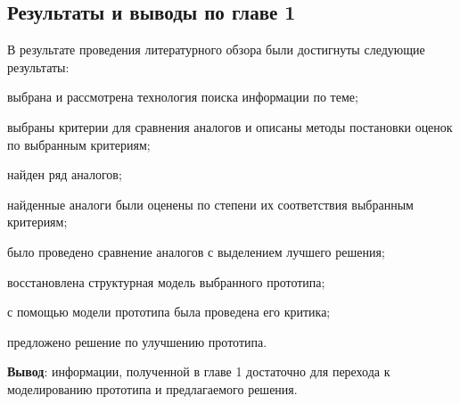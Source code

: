 \subsection{Результаты и выводы по главе 1}

В результате проведения литературного обзора были достигнуты следующие результаты:
\begin{list}{}{\leftmargin=1.5cm}
	\item выбрана и рассмотрена технология поиска информации по теме;
	\item выбраны критерии для сравнения аналогов и описаны методы постановки оценок по выбранным критериям;
	\item найден ряд аналогов;
	\item найденные аналоги были оценены по степени их соответствия выбранным критериям;
	\item было проведено сравнение аналогов с выделением лучшего решения;
	\item восстановлена структурная модель выбранного прототипа;
	\item с помощью модели прототипа была проведена его критика;
	\item предложено решение по улучшению прототипа.
\end{list}

\textbf{Вывод}: информации, полученной в главе 1 достаточно для перехода к моделированию прототипа и предлагаемого решения.
